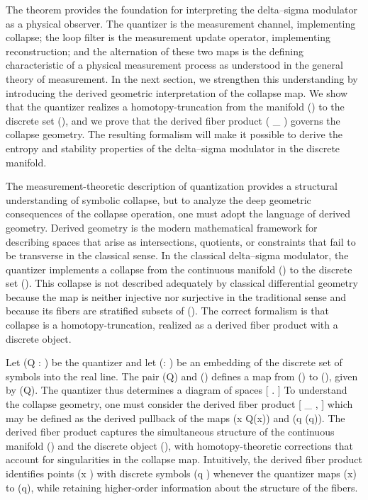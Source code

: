 The theorem provides the foundation for interpreting the delta--sigma modulator as a physical observer. The quantizer is the measurement channel, implementing collapse; the loop filter is the measurement update operator, implementing reconstruction; and the alternation of these two maps is the defining characteristic of a physical measurement process as understood in the general theory of measurement. 
In the next section, we strengthen this understanding by introducing the derived geometric interpretation of the collapse map. We show that the quantizer realizes a homotopy-truncation from the manifold () to the discrete set (\Lambda), and we prove that the derived fiber product ( \times_{} \Lambda) governs the collapse geometry. The resulting formalism will make it possible to derive the entropy and stability properties of the delta--sigma modulator in the discrete manifold.

\noindent
The measurement-theoretic description of quantization provides a structural understanding of symbolic collapse, but to analyze the deep geometric consequences of the collapse operation, one must adopt the language of derived geometry. Derived geometry is the modern mathematical framework for describing spaces that arise as intersections, quotients, or constraints that fail to be transverse in the classical sense. In the classical delta--sigma modulator, the quantizer implements a collapse from the continuous manifold () to the discrete set (\Lambda). This collapse is not described adequately by classical differential geometry because the map is neither injective nor surjective in the traditional sense and because its fibers are stratified subsets of (). The correct formalism is that collapse is a homotopy-truncation, realized as a derived fiber product with a discrete object.

Let (Q :  \to \Lambda) be the quantizer and let (\iota : \Lambda \hookrightarrow {}) be an embedding of the discrete set of symbols into the real line. The pair (Q) and (\iota) defines a map from () to (), given by (\iota \circ Q). The quantizer thus determines a diagram of spaces
[
  \Lambda \xrightarrow{\iota} .
]
To understand the collapse geometry, one must consider the derived fiber product
[
 \times_{} \Lambda,
]
which may be defined as the derived pullback of the maps (x \mapsto Q(x)) and (q \mapsto \iota(q)). The derived fiber product captures the simultaneous structure of the continuous manifold () and the discrete object (\Lambda), with homotopy-theoretic corrections that account for singularities in the collapse map. Intuitively, the derived fiber product identifies points (x \in {}) with discrete symbols (q \in \Lambda) whenever the quantizer maps (x) to (q), while retaining higher-order information about the structure of the fibers.

